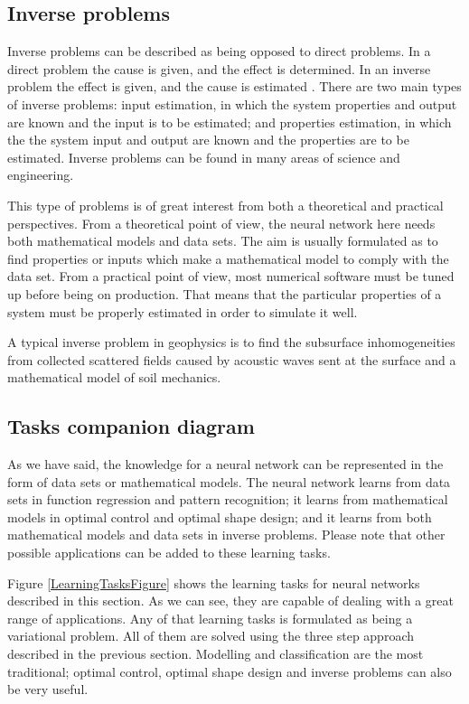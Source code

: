 \subsection{Inverse problems}

Inverse problems can be described as being opposed to direct
problems. In a direct problem the cause is given, and the effect is
determined. In an inverse problem the effect is given, and the cause
is estimated \cite{Kirsch1996} \cite{Sabatier2000} \cite{Ramm2005}.
There are two main types of inverse problems: input estimation, in
which the system properties and output are known and the input is to
be estimated; and properties estimation, in which the the system
input and output are known and the properties are to be estimated.
Inverse problems can be found in many areas of science and
engineering. 

This type of problems is of great interest from both a theoretical and practical perspectives. 
From a theoretical point of view, the neural network here needs both mathematical models and data sets. 
The aim is usually formulated as to find properties or inputs which make a mathematical model to comply with the data set. 
From a practical point of view, most numerical software must be tuned up before being on production. 
That means that the particular properties of a system must be properly estimated in order to simulate it well.

A typical inverse problem in geophysics is to find the 
subsurface inhomogeneities from collected scattered fields caused by
acoustic waves sent at the surface and a mathematical model of soil mechanics.  

\subsection{Tasks companion diagram}

As we have said, the knowledge for a neural network can be represented in the form of data sets or mathematical models. 
The neural network learns from data sets in function regression and pattern recognition; 
it learns from mathematical models in optimal control and optimal shape design; 
and it learns from both mathematical models and data sets in inverse problems. 
Please note that other possible applications can be added to these learning tasks. 

Figure \ref{LearningTasksFigure} shows the learning tasks for neural networks described in this section. 
As we can see, they are capable of dealing with a great range of applications. 
Any of that learning tasks is formulated as being a variational problem. 
All of them are solved using the three step approach described in the previous section. 
Modelling and classification are the most traditional; 
optimal control, optimal shape design and inverse problems can also be very useful. 

